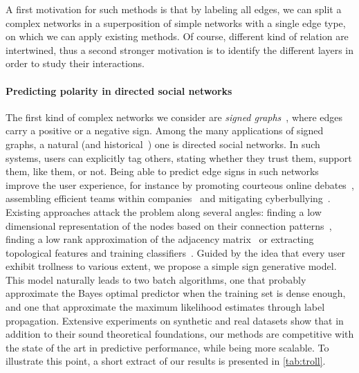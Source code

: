A first motivation for such methods is that by labeling all edges, we can split a complex networks
in a superposition
of simple networks with a single edge type, on which we can apply existing methods. Of course,
different kind of relation are intertwined, thus a second stronger motivation is to identify the
different layers in order to study their interactions.

\vspace{-\baselineskip}
\paragraph{Predicting polarity in directed social networks}

The first kind of complex networks we consider are \emph{signed graphs}~\autocite{Tang2015a},
where edges carry a positive or a negative sign. Among the many applications of signed graphs, a
natural (and historical~\autocite{harary1953}) one is directed social networks. In such systems,
users can explicitly tag others, stating whether they trust them, support them, like them, or not.
Being able to predict edge signs in such networks improve the user experience, for instance by
promoting courteous online debates~\autocite{journalism15}, assembling efficient teams within
companies~\autocite{MLinHR16} and mitigating cyberbullying~\autocite{cyberbullying13}. Existing
approaches attack the problem along several angles: finding a low dimensional representation of the
nodes based on their connection patterns~\autocites{SIGNet17}{SNE17}, finding a low rank approximation
of the adjacency matrix~\autocites{LowRankCompletion14}{OnlineCompletion17} or extracting
topological features and training classifiers~\autocites{Leskovec2010}{Bayesian15}{wu2016troll}.
Guided by the idea that every user exhibit trollness to various extent, we propose a simple sign
generative model. This model naturally leads to two batch algorithms, one that probably approximate the
Bayes optimal predictor when the training set is dense enough, and one that approximate the maximum
likelihood estimates through label propagation. Extensive experiments on synthetic and real datasets
show that in addition to their sound theoretical foundations, our methods are competitive with the
state of the art in predictive performance, while being more scalable. To illustrate this point, a
short extract of our results is presented in \autoref{tab:troll}.

